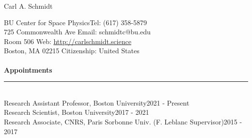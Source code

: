 \documentclass[12pt]{report}
\begin{document}
\newpage  
{\noindent}{\Large Carl A. Schmidt} \\ %
%
%

%
\thispagestyle{myheadings}

\noindent BU Center for Space Physics\hfill Tel: (617) 358-5879\\
725 Commonwealth Ave \hfill Email: schmidtc@bu.edu\\
Room 506 \hfill Web: \url{http://carlschmidt.science}\\
Boston, MA 02215 \hfill Citizenship: United States\\
\vspace{2 mm}\\
\bf{Appointments}\rm\\
\rule{\textwidth}{1pt}\\
\noindent Research Assistant Professor, Boston University\hfill 2021 - Present\\
\noindent Research Scientist, Boston University\hfill 2017 - 2021\\
\noindent Research Associate, CNRS, Paris Sorbonne Univ. (F. Leblanc Supervisor)\hfill 2015 - 2017\\
\end{document}
